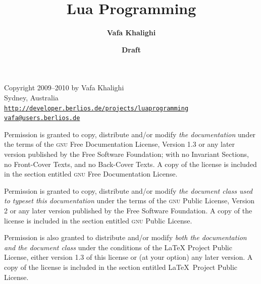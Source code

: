 \documentclass{luaprogramming-doc}
\begin{document}
\title{\color{white}\Huge\sffamily\bfseries Lua Programming}
\author{\color{luaorange}\LARGE\sffamily\bfseries Vafa Khalighi}
\date{\color{luaorange}\large\sffamily\bfseries Draft}

\maketitle
{}
\noindent
Copyright 2009--2010 by Vafa Khalighi\\
Sydney, Australia\\
\href{http://developer.berlios.de/projects/luaprogramming}{\texttt{http://developer.berlios.de/projects/luaprogramming}}\\
\href{mailto:vafa@users.berlios.de}{\texttt{vafa@users.berlios.de}}

\medskip
\noindent
Permission is granted to copy, distribute and/or modify \emph{the documentation}
under the terms of the \textsc{gnu} Free Documentation License, Version 1.3
or any later version published by the Free Software Foundation;
with no Invariant Sections, no Front-Cover Texts, and no Back-Cover Texts.
A copy of the license is included in the section entitled \textsc{gnu}
Free Documentation License.

\medskip\noindent  
Permission is granted to copy, distribute and/or modify \emph{the
document class used to typeset this documentation} under the terms of the \textsc{gnu} Public License, Version 2 or any later version published by the Free Software Foundation.
A copy of the license is included in the section entitled \textsc{gnu}
Public License.

\medskip
\noindent
Permission is also granted to distribute and/or modify \emph{both
the documentation and the document class} under the conditions of the LaTeX
Project Public License, either version 1.3 of this license or (at
your option) any later version. A copy of the license is included in
the section entitled \LaTeX\ Project Public License.
\end{document}
